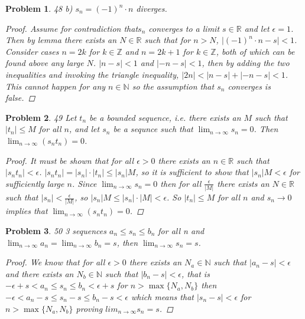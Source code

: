 \documentclass{article}
\newtheorem*{Problem}{Problem}
\begin{document}
     \begin{Problem}
  48 b) $s_n=(-1)^n\cdot n$ diverges.
  \begin{proof}
      Assume for contradiction that$s_n$ converges to a limit $s\in\mathbb{R}$ and let $\epsilon=1$.  Then by lemma there exists an $N\in\mathbb{R}$ such that for $n>N$, $\lvert(-1)^n\cdot n -s\rvert<1$.  Consider cases $n=2k$ for $k\in\mathbb{Z}$ and $n=2k+1$ for $k\in\mathbb{Z}$, both of which can be found above any large $N$.  $\lvert n-s\rvert<1$ and $\lvert -n-s\rvert<1$, then by adding the two inequalities and invoking the triangle inequality, $\lvert 2n\rvert<\lvert n-s\rvert + \lvert -n-s\rvert<1$.  This cannot happen for any $n\in\mathbb{N}$ so the assumption that $s_n$ converges is false.
  \end{proof}
 \end{Problem}
 
      \begin{Problem}
  49 Let $t_n$ be a bounded sequence, i.e. there exists an $M$ such that $\lvert t_n\rvert\leq M$ for all $n$, and let $s_n$ be a sequnce such that $\lim_{n\to\infty}s_n=0$.  Then $\lim_{n\to\infty}(s_nt_n)=0$.
  \begin{proof}
      It must be shown that for all $\epsilon>0$ there exists an $n\in\mathbb{R}$ such that $\lvert s_nt_n\rvert<\epsilon$. $\lvert s_nt_n\rvert=\lvert s_n\rvert\cdot\lvert t_n\rvert\leq\lvert s_n\rvert M$, so it is sufficient to show that $\lvert s_n\rvert M<\epsilon$ for sufficiently large $n$.  Since $\lim_{n\to\infty}s_n=0$ then for all $\frac{\epsilon}{\lvert M\rvert}$ there exists an $N\in\mathbb{R}$ such that $\lvert s_n\rvert<\frac{\epsilon}{\lvert M\rvert}$, so $\lvert s_n\rvert M\leq\lvert s_n\rvert\cdot\lvert M\rvert<\epsilon$.  So $\lvert t_n\rvert\leq M$ for all $n$ and $s_n\to0$ implies that $\lim_{n\to\infty}(s_nt_n)=0$.
  \end{proof}
 \end{Problem}
 
       \begin{Problem}
  50 3 sequences $a_n\leq s_n\leq b_n$ for all n and $\lim_{n\to\infty}a_n=\lim_{n\to\infty}b_n=s$, then $\lim_{n\to\infty}s_n=s$.
  \begin{proof}
      We know that for all $\epsilon>0$ there exists an $N_a\in\mathbb{N}$ such that $\lvert a_n-s\rvert<\epsilon$ and there exists an $N_b\in\mathbb{N}$ such that $\lvert b_n-s\rvert<\epsilon$, that is $-\epsilon+s<a_n\leq s_n\leq b_n<\epsilon+s$ for $n>\max\{N_a,N_b\}$ then $-\epsilon<a_n-s\leq s_n-s\leq b_n-s<\epsilon$ which means that $\lvert s_n-s\rvert<\epsilon$ for $n>\max\{N_a,N_b\}$ proving $lim_{n\to\infty}s_n=s$.
  \end{proof}
 \end{Problem}
 
\end{document}
